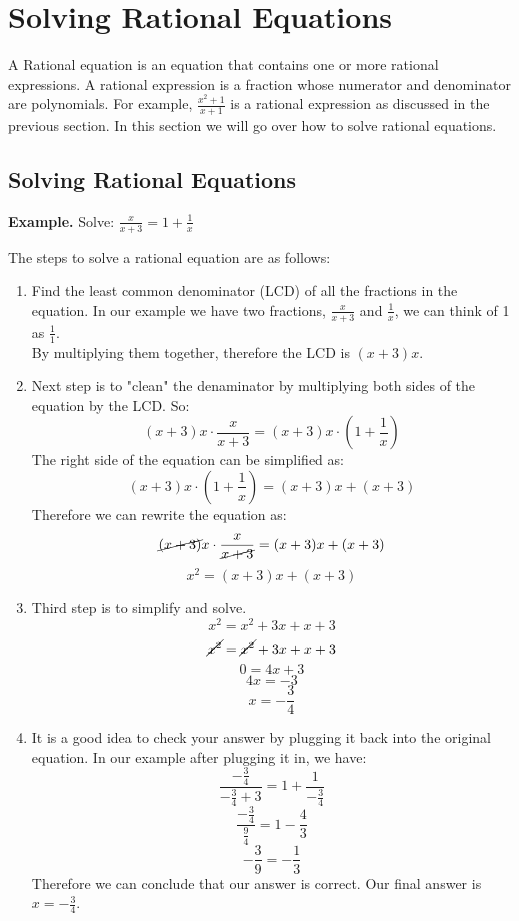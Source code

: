 \section{Solving Rational Equations}
A Rational equation is an equation that contains one or more rational expressions. A rational expression is a fraction whose numerator and denominator are polynomials. For example, $\frac{x^2+1}{x+1}$ is a rational expression as discussed in the previous section. In this section we will go over how to solve rational equations.

\subsection{Solving Rational Equations}

\textbf{Example.} Solve: $\frac{x}{x+3} = 1+\frac{1}{x}$

The steps to solve a rational equation are as follows:
\begin{enumerate}
    \item Find the least common denominator (LCD) of all the fractions in the equation. In our example we have two fractions, $\frac{x}{x+3}$ and $\frac{1}{x}$, we can think of 1 as $\frac{1}{1}$. \\
    By multiplying them together, therefore the LCD is $(x+3)x$.
    \item Next step is to "clean" the denaminator  by multiplying both sides of the equation by the LCD. So:
    $$ (x+3)x \cdot \frac{x}{x+3} = (x+3)x \cdot \left(1+\frac{1}{x}\right)$$
    The right side of the equation can be simplified as:
    $$ (x+3)x \cdot \left(1+\frac{1}{x}\right) = (x+3)x + (x+3)$$
    Therefore we can rewrite the equation as:
    $$ \cancel{(x+3)}x \cdot \frac{x}{\cancel{x+3}} =  (x+3)x + (x+3)$$
    $$ x^2 =  (x+3)x + (x+3)$$
    \item Third step is to simplify and solve. 
    $$ x^2 =  x^2+3x+x+3$$
    $$ \cancel{x^2} =  \cancel{x^2}+3x+x+3$$
    $$0 =  4x+3$$
    $$4x =  -3$$
    $$x =  -\frac{3}{4}$$
    \item It is a good idea to check your answer by plugging it back into the original equation. In our example after plugging it in, we have:
    $$ \frac{-\frac{3}{4}}{-\frac{3}{4}+3} = 1+\frac{1}{-\frac{3}{4}}$$
    $$ \frac{-\frac{3}{4}}{\frac{9}{4}} = 1-\frac{4}{3}$$
    $$ -\frac{3}{9} = -\frac{1}{3} $$
    Therefore we can conclude that our answer is correct. Our final answer is $x = -\frac{3}{4}$.
\end{enumerate}



